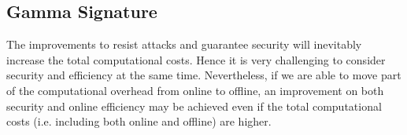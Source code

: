 \documentclass[journal]{IEEEtran}
\begin{document}
%

\subsection{Gamma Signature}
The improvements to resist attacks and guarantee security will inevitably increase the total computational costs. Hence it is very challenging to consider security and efficiency at the same time. Nevertheless, if we are able to move part of the computational overhead from online to offline, an improvement on both security and online efficiency may be achieved even if the total computational costs (i.e. including both online and offline) are higher.
\end{document}
